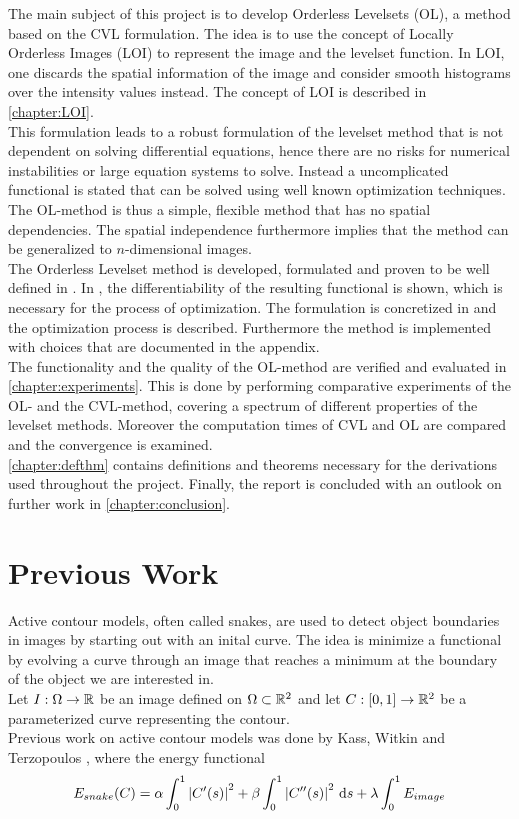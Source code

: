 The main subject of this project is to develop Orderless Levelsets (OL), a method based on the CVL formulation. The idea is to use the concept of Locally Orderless Images (LOI) to represent the image and the levelset function. In LOI, one discards the spatial information of the image and consider smooth histograms over the intensity values instead. The concept of LOI is described in \cref{chapter:LOI}.\\
This formulation leads to a robust formulation of the levelset method that is not dependent on solving differential equations, hence there are no risks for numerical instabilities or large equation systems to solve. Instead a uncomplicated functional is stated that can be solved using well known optimization techniques. The OL-method is thus a simple, flexible method that has no spatial dependencies. The spatial independence furthermore implies that the method can be generalized to $n$-dimensional images.\\
The Orderless Levelset method is developed, formulated and proven to be well defined in . In , the differentiability of the resulting functional is shown, which is necessary for the process of optimization. The formulation is concretized in  and the optimization process is described. Furthermore the method is implemented with choices that are documented in the appendix.\\

The functionality and the quality of the OL-method are verified and evaluated in \cref{chapter:experiments}. This is done by performing comparative experiments of the OL- and the CVL-method, covering a spectrum of different properties of the levelset methods. Moreover the computation times of CVL and OL are compared and the convergence is examined.\\
\cref{chapter:defthm} contains definitions and theorems necessary for the derivations used throughout the project. Finally, the report is concluded with an outlook on further work in \cref{chapter:conclusion}.

\section{Previous Work}

Active contour models, often called snakes, are used to detect object boundaries in images by starting out with an inital curve. The idea is minimize a functional by evolving a curve through an image that reaches a minimum at the boundary of the object we are interested in.\\
Let $I:\Omega\to \mathbb R$ be an image defined on $\Omega\subset\mathbb R^2$ and let $C:[0,1]\to\mathbb R^2$ be a parameterized curve representing the contour.\\
Previous work on active contour models was done by Kass, Witkin and Terzopoulos \cite{kass.88}, where the energy functional
\begin{equation}
  E_{snake}(C) = \alpha\int_0^1 \left| {C'(s)} \right|^2  + \beta\int_0^1 \left| {C''(s)} \right|^2\,{\rm d} s + \lambda\int_0^1 E_{image}
\end{equation}

